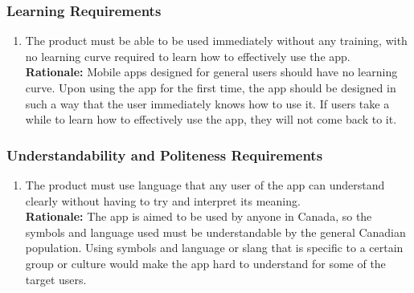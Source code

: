 \documentclass[]{article}
\begin{document}
\subsubsection{Learning Requirements}
\label{ssub:learning_requirements}
\begin{enumerate}[{UH-L}1. ]
	\item The product must be able to be used immediately without any training, with no learning curve required to learn how to effectively use the app. \\
	{\bf Rationale:} Mobile apps designed for general users should have no learning curve. Upon using the app for the first time, the app should be designed in such a way that the user immediately knows how to use it. If users take a while to learn how to effectively use the app, they will not come back to it.
\end{enumerate}

\subsubsection{Understandability and Politeness Requirements}
\label{ssub:understandability_and_politeness_requirements}
\begin{enumerate}[{UH-UP}1. ]
	\item The product must use language that any user of the app can understand clearly without having to try and interpret its meaning.  \\
	{\bf Rationale:} The app is aimed to be used by anyone in Canada, so the symbols and language used must be understandable by the general Canadian population. Using symbols and language or slang that is specific to a certain group or culture would make the app hard to understand for some of the target users.
\end{enumerate}
\end{document}
